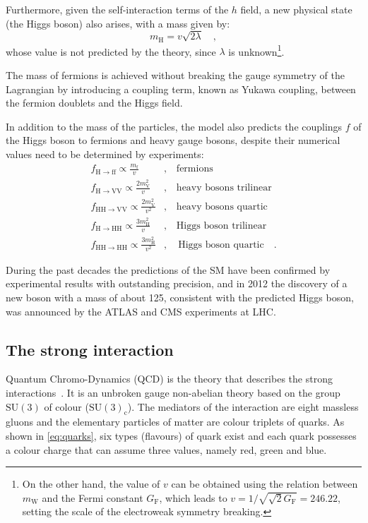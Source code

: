 Furthermore, given the self-interaction terms of the $h$ field, a new physical state (the Higgs boson) also arises, with a mass given by:
\begin{equation}
m_\mathrm{H} = v\sqrt{2\lambda} \quad,
\end{equation}
\noindent whose value is not predicted by the theory, since $\lambda$ is unknown\footnote{On the other hand, the value of $v$ can be obtained using the relation between $m_\mathrm{W}$ and the Fermi constant $G_\mathrm{F}$, which leads to $v = 1/\sqrt{\sqrt{2}G_\mathrm{F}} = 246.22$\GeV, setting the scale of the electroweak symmetry breaking.}.

The mass of fermions is achieved without breaking the gauge symmetry of the Lagrangian by introducing a coupling term, known as Yukawa coupling, between the fermion doublets and the Higgs field.

In addition to the mass of the particles, the model also predicts the couplings $f$ of the Higgs boson to fermions and heavy gauge bosons, despite their numerical values need to be determined by experiments:
\begin{equation}
\begin{split}
f_\mathrm{H\to ff} \propto \frac{m_\mathrm{f}}{v} &,\quad \text{fermions}\\
f_\mathrm{H\to VV} \propto \frac{2m_\mathrm{V}^2}{v} &,\quad \text{heavy bosons trilinear}\\
f_\mathrm{HH\to VV} \propto \frac{2m_\mathrm{V}^2}{v^2} &,\quad \text{heavy bosons quartic}\\
f_\mathrm{H\to HH} \propto \frac{3m_\mathrm{H}^2}{v} &,\quad \text{Higgs boson trilinear}\\
f_\mathrm{HH\to HH} \propto \frac{3m_\mathrm{H}^2}{v^2} &,\quad \text{Higgs boson quartic} \quad .
\end{split}
\end{equation}

During the past decades the predictions of the SM have been confirmed by experimental results with outstanding precision, and in 2012 the discovery of a new boson with a mass of about 125\GeV, consistent with the predicted Higgs boson, was announced by the ATLAS and CMS experiments at LHC.


\subsection{The strong interaction}

Quantum Chromo-Dynamics (QCD) is the theory that describes the strong interactions~\cite{Ellis:1991qj}. It is an unbroken gauge non-abelian theory based on the group $\mathrm{SU(3)}$ of colour ($\mathrm{SU(3)_c}$). The mediators of the interaction are eight massless gluons and the elementary particles of matter are colour triplets of quarks. As shown in \eqref{eq:quarks}, six types (flavours) of quark exist and each quark possesses a colour charge that can assume three values, namely red, green and blue.

